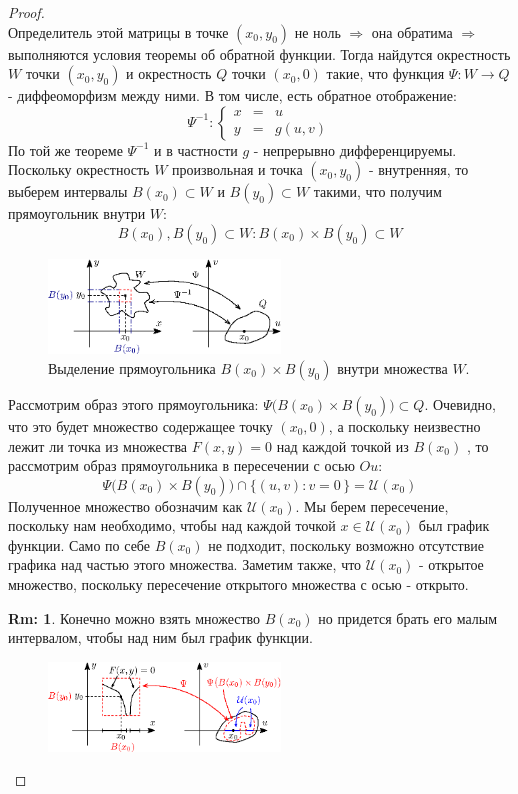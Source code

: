 \documentclass[12pt]{article}
\newcommand{\MU}{\mathcal{U}}
\theoremstyle{definition}
\newtheorem{rem}{Rm:}
\begin{document}
\begin{proof}
$$	$$
	Определитель этой матрицы в точке $(x_0,y_0)$ не ноль $\Rightarrow$ она обратима $\Rightarrow$ выполняются условия теоремы об обратной функции. Тогда найдутся окрестность $W$ точки $(x_0, y_0)$ и окрестность $Q$ точки $(x_0, 0)$ такие, что функция $\Psi \colon W \to Q$ - диффеоморфизм между ними. В том числе, есть обратное отображение:
	$$
		\Psi^{-1} \colon \left\{
		\begin{array}{lcl}
			x& = &u \\
			y& = &g(u,v)
		\end{array}\right.
	$$
	По той же теореме $\Psi^{-1}$ и в частности $g$ - непрерывно дифференцируемы. Поскольку окрестность $W$ произвольная и точка $(x_0, y_0)$ - внутренняя, то выберем интервалы $B(x_0) \subset W$ и $B(y_0) \subset W$ такими, что получим прямоугольник внутри $W$: 
	$$
		B(x_0), B(y_0) \subset W \colon B(x_0)\times B(y_0) \subset W
	$$
	\begin{figure}[H]
		\centering
		\includegraphics[width=0.55\textwidth]{16_4.eps}
		\caption{Выделение прямоугольника $B(x_0)\times B(y_0)$ внутри множества $W$.}
		\label{16_4}
	\end{figure}
	Рассмотрим образ этого прямоугольника: $\Psi\big(B(x_0)\times B(y_0)\big) \subset Q$.
	Очевидно, что это будет множество содержащее точку $(x_0,0)$, а поскольку неизвестно лежит ли точка из множества $F(x,y) = 0$ над каждой точкой из $B(x_0)$ , то рассмотрим образ прямоугольника в пересечении с осью $Ou$:
	$$
		\Psi\big(B(x_0)\times B(y_0)\big) \cap \{(u,v) \colon v = 0 \, \} = \MU(x_0)
	$$
	Полученное множество обозначим как $\MU(x_0)$. Мы берем пересечение, поскольку нам необходимо, чтобы над каждой точкой $x \in \MU(x_0)$ был график функции. Само по себе $B(x_0)$ не подходит, поскольку возможно отсутствие графика над частью этого множества. Заметим также, что $\MU(x_0)$ - открытое множество, поскольку пересечение открытого множества с осью - открыто.
	\begin{rem}
		Конечно можно взять множество $B(x_0)$ но придется брать его малым интервалом, чтобы над ним был график функции.
	\end{rem}
	\begin{figure}[H]
		\centering
		\includegraphics[width=0.55\textwidth]{16_5.eps}

\end{figure}
\end{proof}
\end{document}
